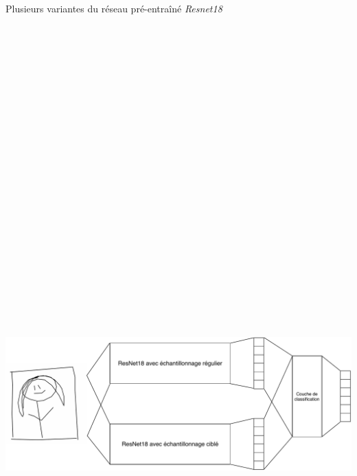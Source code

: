 \vspace{-15pt}
Plusieurs variantes du réseau pré-entraîné \emph{Resnet18}
\begin{center}

\includegraphics[width=30cm,height=30cm,keepaspectratio]{figures/structure_reseau.pdf}
      
\end{center}

